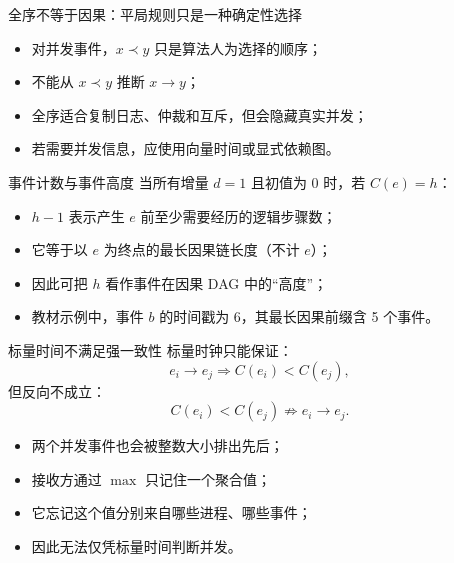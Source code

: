 \documentclass[UTF8,fontset=none,aspectratio=169,10pt]{beamer}
\begin{document}
\begin{frame}{全序不等于因果：平局规则只是一种确定性选择}
\begin{center}
\end{center}
\vfill
\begin{itemize}
  \item 对并发事件，$x\prec y$ 只是算法人为选择的顺序；
  \item 不能从 $x\prec y$ 推断 $x\rightarrow y$；
  \item 全序适合复制日志、仲裁和互斥，但会隐藏真实并发；
  \item 若需要并发信息，应使用向量时间或显式依赖图。
\end{itemize}
\end{frame}

\begin{frame}{事件计数与事件高度}
当所有增量 $d=1$ 且初值为 0 时，若 $C(e)=h$：
\begin{itemize}
  \item $h-1$ 表示产生 $e$ 前至少需要经历的逻辑步骤数；
  \item 它等于以 $e$ 为终点的最长因果链长度（不计 $e$）；
  \item 因此可把 $h$ 看作事件在因果 DAG 中的“高度”；
  \item 教材示例中，事件 $b$ 的时间戳为 6，其最长因果前缀含 5 个事件。
\end{itemize}
\vfill
{}
\end{frame}

\begin{frame}{标量时间不满足强一致性}
标量时钟只能保证：
\[
e_i\rightarrow e_j\Rightarrow C(e_i)<C(e_j),
\]
但反向不成立：
\[
C(e_i)<C(e_j)\not\Rightarrow e_i\rightarrow e_j.
\]
\begin{itemize}
  \item 两个并发事件也会被整数大小排出先后；
  \item 接收方通过 $\max$ 只记住一个聚合值；
  \item 它忘记这个值分别来自哪些进程、哪些事件；
  \item 因此无法仅凭标量时间判断并发。
\end{itemize}
\end{frame}
\end{document}
